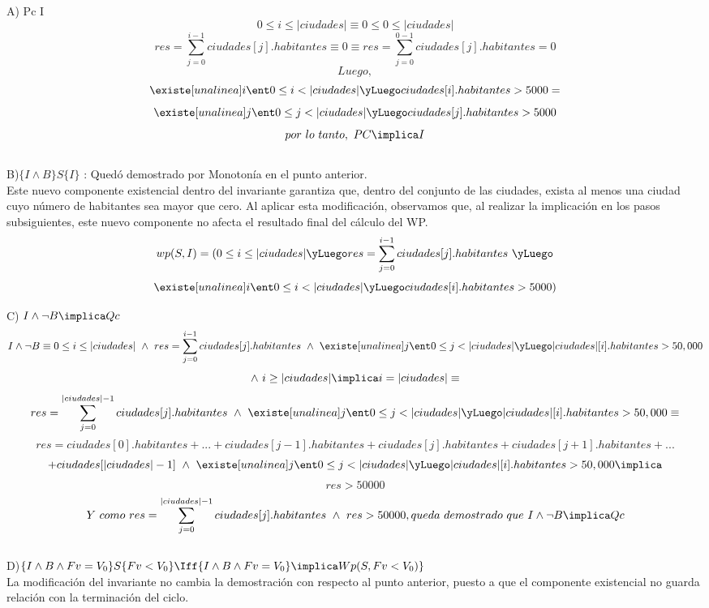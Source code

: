 \documentclass[10pt,a4paper]{article}
\begin{document}
A) Pc \implica I \\
\[0\leq i \leq |ciudades| \equiv 0\leq 0 \leq |ciudades|\]
\[res = \sum\limits_{j=0}^{i-1}ciudades[j].habitantes \equiv 0 \equiv res = \sum\limits_{j=0}^{0-1}ciudades[j].habitantes = 0 \]
\[Luego,\]
\[\existe [unalinea]i{\ent}{0 \leq i < |ciudades| \yLuego ciudades[i].habitantes >5000} = \]
\[\existe [unalinea]j{\ent}{0 \leq j < |ciudades| \yLuego ciudades[j].habitantes >5000}  \]
\[por \ lo \ tanto, \ PC \implica I \] \\


B)$\{I \land B \} S \{I\}$ \vspace{0.2cm}: Quedó demostrado por Monotonía en el punto anterior. \\
Este nuevo componente existencial dentro del invariante garantiza que, dentro del conjunto de las ciudades, exista al menos una ciudad cuyo número de habitantes sea mayor que cero. Al aplicar esta modificación, observamos que, al realizar la implicación en los pasos subsiguientes, este nuevo componente no afecta el resultado final del cálculo del WP.
\[wp(S,I)=(0 \leq i \leq |ciudades| \yLuego res = \sum\limits_{j=0}^{i-1}ciudades[j].habitantes \ \yLuego \]
 \[\existe [unalinea]i{\ent}{0 \leq i < |ciudades| \yLuego ciudades[i].habitantes >5000} )\\\]


C) $I \land \neg B \implica Qc$\\
	\[I \land \neg B \equiv 0\leq i \leq |ciudades| \ \land \ res = \sum\limits_{j=0}^{i-1}ciudades[j].habitantes \  \land \  \existe[unalinea]j{\ent}{0\leq j <|ciudades| \yLuego |ciudades|[i].habitantes > 50,000} \]
	\[ \land \ i \geq |ciudades| \implica i=|ciudades| \equiv \]
	\[res= \sum\limits_{j=0}^{|ciudades|-1}ciudades[j].habitantes \ \land \ \existe[unalinea]j{\ent}{0\leq j <|ciudades| \yLuego |ciudades|[i].habitantes > 50,000} \equiv \]
	\[res = ciudades[0].habitantes+...+ciudades[j-1].habitantes+ciudades[j].habitantes+ciudades[j+1].habitantes+...\]
	\[+ciudades[|ciudades|-1] \ \land  \ \existe[unalinea]j{\ent}{0\leq j <|ciudades| \yLuego |ciudades|[i].habitantes > 50,000}  \implica \]
	\[res >50000\]
	\[Y \ como \ res= \sum\limits_{j=0}^{|ciudades|-1}ciudades[j].habitantes \ \land \ res>50000, queda \ demostrado \ que \ I \land \neg B \implica Qc   \] \\

D)$\{I \land B \land Fv = V_0\} S \{Fv < V_0\} \Iff \{I \land B \land Fv = V_0\} \implica Wp (S, Fv < V_0 )\}$\\ La modificación del invariante no cambia la demostración con respecto al punto anterior, puesto a que el componente existencial no guarda relación con la terminación del ciclo. \\
\end{document}
